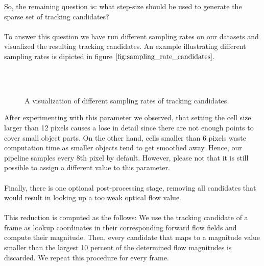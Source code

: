 So, the remaining question is: what step-size should be used to generate the sparse set of tracking candidates? \\ \\
To answer this question we have run different sampling rates on our datasets and visualized the resulting tracking candidates. An example illustrating different sampling rates is dipicted in figure $\ref{fig:sampling_rate_candidates}$. \\ \\
\begin{figure}[H]
\begin{center}
~
\end{center}
\caption[Density Of Candidates For Different Sampling Rates]{A visualization of different sampling rates of tracking candidates}
\label{fig:sampling_rate_candidates}
\end{figure}
After experimenting with this parameter we observed, that setting the cell size larger than 12 pixels causes a lose in detail since there are not enough points to cover small object parts. On the other hand, cells smaller than 6 pixels waste computation time as smaller objects tend to get smoothed away. Hence, our pipeline samples every 8th pixel by default. However, please not that it is still possible to assign a different value to this parameter. \\ \\
Finally, there is one optional post-processing stage, removing all candidates that would result in looking up a too weak optical flow value. \\ \\
This reduction is computed as the follows: We use the tracking candidate of a frame as lookup coordinates in their corresponding forward flow fields and compute their magnitude. Then, every candidate that maps to a magnitude value smaller than the largest 10 percent of the determined flow magnitudes is discarded. We repeat this procedure for every frame. \\ \\
